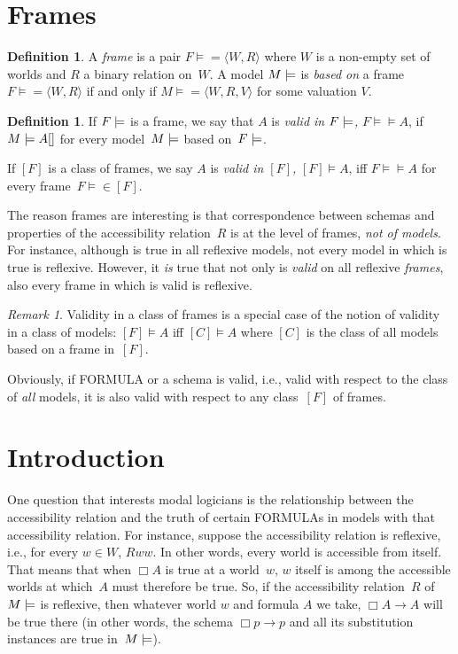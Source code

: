 \documentclass[10pt,a4paper]{article}
\newcommand*{\olup}[1]{\MakeUppercase{#1}}
\theoremstyle{plain}
\theoremstyle{definition}
\newtheorem{defn}[thm]{Definition}
\theoremstyle{remark}
\newtheorem{rem}[thm]{Remark}
\newcommand*{\olfileid}[3]{}
\newcommand*{\olsection}[1]{\section*{#1}}
\providecommand{\lif}{\mathbin{\rightarrow}}
\providecommand{\Entails}{\mathrel{\models}}
\providecommand{\mSat}[3]{\ensuremath{#1 \models #2[#3]}}
\providecommand{\mModel}[2]{\ensuremath{#1 \models #2}}
\providecommand{\tuple}[1]{\langle #1 \rangle}
\providecommand{\Ax}{\mathrm{Ax}}
\providecommand{\mClass}[1]{[#1]}
\begin{document}
\olfileid{nml}{frd}{fra}

\olsection{Frames}

\begin{defn}
  A \emph{frame} is a pair $\mModel{F} = \tuple{W,R}$ where $W$ is a
  non-empty set of worlds and $R$ a binary relation on~$W$. A model
  $\mModel{M}$ is \emph{based on} a frame $\mModel{F} = \tuple{W,R}$
  if and only if $\mModel{M} = \tuple{W, R, V}$ for some valuation $V$.
\end{defn}

\begin{defn}
  If $\mModel{F}$ is a frame, we say that $A$ is \emph{valid in
    $\mModel{F}$,} $\mModel{F} \Entails A$, if $\mSat{M}{A}$ for
  every model~$\mModel{M}$ based on~$\mModel{F}$.
  
  If $\mClass{F}$ is a class of frames, we say $A$ is \emph{valid in
    $\mClass{F}$,} $\mClass{F} \Entails A$, iff $\mModel{F} \Entails
  A$ for every frame~$\mModel{F} \in \mClass{F}$.
\end{defn}

The reason frames are interesting is that correspondence between
schemas and properties of the accessibility relation~$R$ is at the
level of frames, \emph{not of models}. For instance, although \Ax{T}
is true in all reflexive models, not every model in which \Ax{T} is
true is reflexive. However, it \emph{is} true that not only is \Ax{T}
\emph{valid} on all reflexive \emph{frames}, also every frame in
which \Ax{T} is valid is reflexive.

\begin{rem}
Validity in a class of frames is a special case of the notion of
validity in a class of models: $\mClass{F} \Entails A$ iff
$\mClass{C} \Entails A$ where $\mClass{C}$ is the class of all models
based on a frame in~$\mClass{F}$.

Obviously, if \olup{formula} or a schema is valid, i.e., valid with
respect to the class of \emph{all} models, it is also valid with
respect to any class~$\mClass{F}$ of frames.
\end{rem}





\olfileid{nml}{frd}{int}

\olsection{Introduction}

One question that interests modal logicians is the relationship
between the accessibility relation and the truth of certain
\olup{formula}s in models with that accessibility relation. For instance,
suppose the accessibility relation is reflexive, i.e., for every $w
\in W$, $Rww$. In other words, every world is accessible from
itself. That means that when $\Box A$ is true at a world~$w$, $w$
itself is among the accessible worlds at which~$A$ must therefore be
true. So, if the accessibility relation~$R$ of~$\mModel{M}$ is
reflexive, then whatever world $w$ and formula $A$ we take, $\Box A
\lif A$ will be true there (in other words, the schema $\Box p \lif
p$ and all its substitution instances are true in~$\mModel{M}$).
\end{document}
